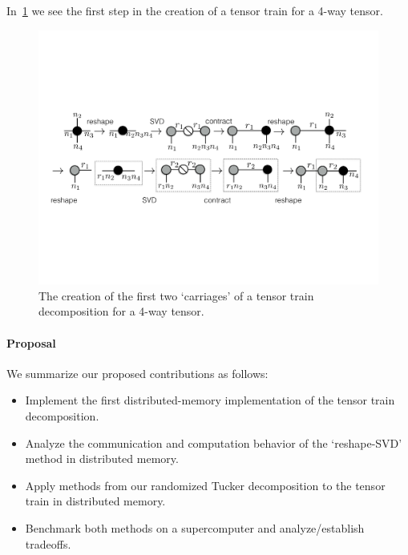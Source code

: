 In~\cref{fig:ttsequence} we see the first step in the creation of a tensor train for a 4-way tensor. 

\begin{figure}
  \centering 
  \includegraphics[width=\linewidth]{thpropfigs/ttsequence}
  \caption{The creation of the first two `carriages' of a tensor train decomposition for a 4-way tensor.}
  \label{fig:ttsequence}
\end{figure}

\paragraph{Proposal}
We summarize our proposed contributions as follows:
\begin{itemize}
  \item Implement the first distributed-memory implementation of the tensor train decomposition.
  \item Analyze the communication and computation behavior of the `reshape-SVD' method in distributed memory.
  \item Apply methods from our randomized Tucker decomposition to the tensor train in distributed memory.
  \item Benchmark both methods on a supercomputer and analyze/establish tradeoffs.
\end{itemize}